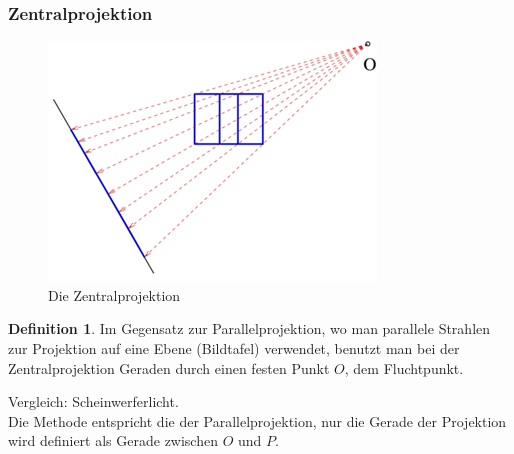 \documentclass[a4paper,10pt,DIV9, BCOR12mm, oneside,openright,openbib]{scrreprt}
\theoremstyle{definition}
\newtheorem{mydef}{Definition}[section]
\theoremstyle{plain}
\begin{document}
\subsubsection{Zentralprojektion}
\begin{figure}[h!]
 \centering
 \includegraphics[scale=0.5,keepaspectratio=true]{./Bilder/zentrproj.jpg}
 \caption{Die Zentralprojektion}
 \label{fig:zentrproj}
\end{figure}
\begin{mydef}
Im Gegensatz zur Parallelprojektion, wo man parallele Strahlen zur Projektion auf eine Ebene (Bildtafel) verwendet, benutzt man bei der Zentralprojektion Geraden durch einen festen Punkt $O$, dem Fluchtpunkt. 
\end{mydef}
Vergleich: Scheinwerferlicht.\\
Die Methode entspricht die der Parallelprojektion, nur die Gerade der Projektion wird definiert als Gerade zwischen $O$ und $P$.
 
\clearpage
\end{document}
